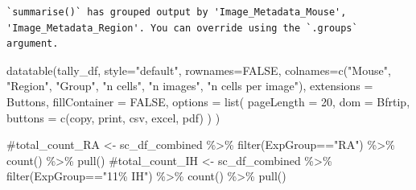 \documentclass[
  12pt,
  letterpaper,
  DIV=11,
  numbers=noendperiod]{scrartcl}
\newenvironment{Shaded}{\begin{snugshade}}{\end{snugshade}}
\newcommand{\AttributeTok}[1]{\textcolor[rgb]{0.40,0.45,0.13}{#1}}
\newcommand{\CommentTok}[1]{\textcolor[rgb]{0.37,0.37,0.37}{#1}}
\newcommand{\ConstantTok}[1]{\textcolor[rgb]{0.56,0.35,0.01}{#1}}
\newcommand{\DecValTok}[1]{\textcolor[rgb]{0.68,0.00,0.00}{#1}}
\newcommand{\FunctionTok}[1]{\textcolor[rgb]{0.28,0.35,0.67}{#1}}
\newcommand{\NormalTok}[1]{\textcolor[rgb]{0.00,0.23,0.31}{#1}}
\newcommand{\StringTok}[1]{\textcolor[rgb]{0.13,0.47,0.30}{#1}}
\begin{document}
\begin{verbatim}
`summarise()` has grouped output by 'Image_Metadata_Mouse',
'Image_Metadata_Region'. You can override using the `.groups` argument.
\end{verbatim}

\begin{Shaded}
\begin{Highlighting}[]
\FunctionTok{datatable}\NormalTok{(tally\_df, }
          \AttributeTok{style=}\StringTok{"default"}\NormalTok{,}
          \AttributeTok{rownames=}\ConstantTok{FALSE}\NormalTok{, }
          \AttributeTok{colnames=}\FunctionTok{c}\NormalTok{(}\StringTok{"Mouse"}\NormalTok{, }\StringTok{"Region"}\NormalTok{, }\StringTok{"Group"}\NormalTok{, }\StringTok{"n cells"}\NormalTok{, }\StringTok{"n images"}\NormalTok{, }\StringTok{"n cells per image"}\NormalTok{),}
          \AttributeTok{extensions =} \StringTok{\textquotesingle{}Buttons\textquotesingle{}}\NormalTok{,}
          \AttributeTok{fillContainer =} \ConstantTok{FALSE}\NormalTok{,}
          \AttributeTok{options =} \FunctionTok{list}\NormalTok{(}
            \AttributeTok{pageLength =} \DecValTok{20}\NormalTok{, }
            \AttributeTok{dom =} \StringTok{\textquotesingle{}Bfrtip\textquotesingle{}}\NormalTok{,}
            \AttributeTok{buttons =} \FunctionTok{c}\NormalTok{(}\StringTok{\textquotesingle{}copy\textquotesingle{}}\NormalTok{, }\StringTok{\textquotesingle{}print\textquotesingle{}}\NormalTok{, }\StringTok{\textquotesingle{}csv\textquotesingle{}}\NormalTok{, }\StringTok{\textquotesingle{}excel\textquotesingle{}}\NormalTok{, }\StringTok{\textquotesingle{}pdf\textquotesingle{}}\NormalTok{)}
\NormalTok{            )}
\NormalTok{          )}
\end{Highlighting}
\end{Shaded}

\begin{Shaded}
\begin{Highlighting}[]
\CommentTok{\#total\_count\_RA \textless{}{-} sc\_df\_combined \%\textgreater{}\% filter(ExpGroup=="RA") \%\textgreater{}\% count() \%\textgreater{}\% pull()}
\CommentTok{\#total\_count\_IH \textless{}{-} sc\_df\_combined \%\textgreater{}\% filter(ExpGroup=="11\% IH") \%\textgreater{}\% count() \%\textgreater{}\% pull()}
\end{Highlighting}
\end{Shaded}
\end{document}
